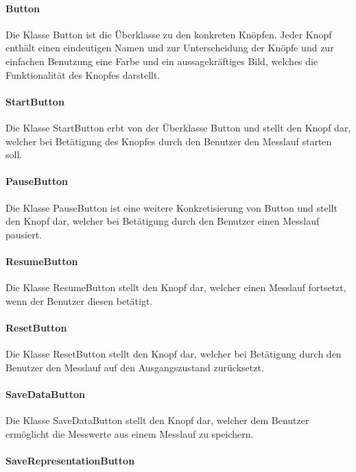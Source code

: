 \documentclass[parskip=full]{scrartcl}
\begin{document}
\paragraph{Button}

Die Klasse Button ist die Überklasse zu den konkreten Knöpfen. Jeder Knopf enthält einen eindeutigen Namen und zur Unterscheidung der Knöpfe und zur einfachen Benutzung eine Farbe und ein aussagekräftiges Bild, welches die Funktionalität des Knopfes darstellt.

\paragraph{StartButton}

Die Klasse StartButton erbt von der Überklasse Button und stellt den Knopf dar, welcher bei Betätigung des Knopfes durch den Benutzer den Messlauf starten soll.

\paragraph{PauseButton}

Die Klasse PauseButton ist eine weitere Konkretisierung von Button und stellt den Knopf dar, welcher bei Betätigung durch den Benutzer einen Messlauf pausiert.

\paragraph{ResumeButton}

Die Klasse ResumeButton stellt den Knopf dar, welcher einen Messlauf fortsetzt, wenn der Benutzer diesen betätigt.

\paragraph{ResetButton}

Die Klasse ResetButton stellt den Knopf dar, welcher bei Betätigung durch den Benutzer den Messlauf auf den Ausgangszustand zurücksetzt.

\paragraph{SaveDataButton}

Die Klasse SaveDataButton stellt den Knopf dar, welcher dem Benutzer ermöglicht die Messwerte aus einem Messlauf zu speichern.

\paragraph{SaveRepresentationButton}
\end{document}
